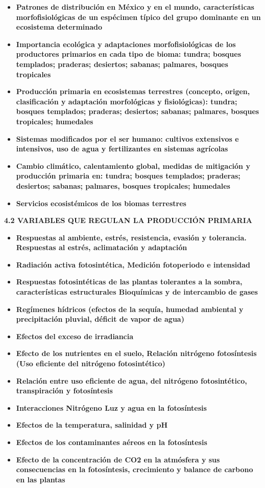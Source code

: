 \documentclass[
]{article}
\begin{document}
\begin{itemize}
\item
  \textbf{Patrones de distribución en México y en el mundo,
  características morfofisiológicas de un espécimen típico del grupo
  dominante en un ecosistema determinado}
\item
  \textbf{Importancia ecológica y adaptaciones morfofisiológicas de los
  productores primarios en cada tipo de bioma: tundra; bosques
  templados; praderas; desiertos; sabanas; palmares, bosques tropicales}
\item
  \textbf{Producción primaria en ecosistemas terrestres (concepto,
  origen, clasificación y adaptación morfológicas y fisiológicas):
  tundra; bosques templados; praderas; desiertos; sabanas; palmares,
  bosques tropicales; humedales}
\item
  \textbf{Sistemas modificados por el ser humano: cultivos extensivos e
  intensivos, uso de agua y fertilizantes en sistemas agrícolas}
\item
  \textbf{Cambio climático, calentamiento global, medidas de mitigación
  y producción primaria en: tundra; bosques templados; praderas;
  desiertos; sabanas; palmares, bosques tropicales; humedales}
\item
  \textbf{Servicios ecosistémicos de los biomas terrestres}
\end{itemize}

\textbf{4.2 VARIABLES QUE REGULAN LA PRODUCCIÓN PRIMARIA}

\begin{itemize}
\item
  \textbf{Respuestas al ambiente, estrés, resistencia, evasión y
  tolerancia. Respuestas al estrés, aclimatación y adaptación}
\item
  \textbf{Radiación activa fotosintética, Medición fotoperiodo e
  intensidad}
\item
  \textbf{Respuestas fotosintéticas de las plantas tolerantes a la
  sombra, características estructurales Bioquímicas y de intercambio de
  gases}
\item
  \textbf{Regímenes hídricos (efectos de la sequía, humedad ambiental y
  precipitación pluvial, déficit de vapor de agua)}
\item
  \textbf{Efectos del exceso de irradiancia}
\item
  \textbf{Efecto de los nutrientes en el suelo, Relación nitrógeno
  fotosíntesis (Uso eficiente del nitrógeno fotosintético)}
\item
  \textbf{Relación entre uso eficiente de agua, del nitrógeno
  fotosintético, transpiración y fotosíntesis}
\item
  \textbf{Interacciones Nitrógeno Luz y agua en la fotosíntesis}
\item
  \textbf{Efectos de la temperatura, salinidad y pH}
\item
  \textbf{Efectos de los contaminantes aéreos en la fotosíntesis}
\item
  \textbf{Efecto de la concentración de CO2 en la atmósfera y sus
  consecuencias en la fotosíntesis, crecimiento y balance de carbono en
  las plantas}
\end{itemize}
\end{document}

